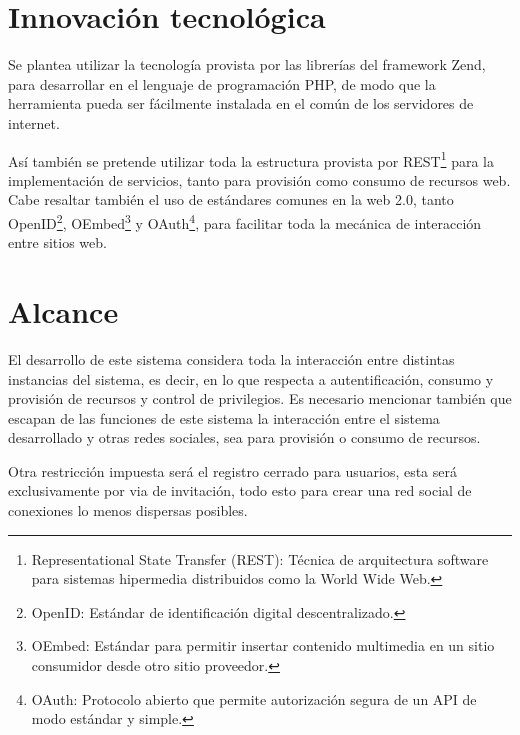 \documentclass[letterpaper,11pt]{article}
\begin{document}
\section{Innovación tecnológica}
Se plantea utilizar la tecnología provista por las librerías del framework Zend, para
desarrollar en el lenguaje de programación PHP, de modo que la herramienta pueda ser
fácilmente instalada en el común de los servidores de internet.

Así también se pretende utilizar toda la estructura provista por REST\footnote{Representational
State Transfer (REST): Técnica de arquitectura software para sistemas hipermedia distribuidos
como la World Wide Web.} para la implementación de servicios, tanto para provisión como
consumo de recursos web. Cabe resaltar también el uso de estándares comunes en la web 2.0, 
tanto OpenID\footnote{OpenID: Estándar de identificación digital descentralizado.},
OEmbed\footnote{OEmbed: Estándar para permitir insertar contenido multimedia en un sitio
consumidor desde otro sitio proveedor.} y OAuth\footnote{OAuth: Protocolo abierto que permite
autorización segura de un API de modo estándar y simple.}, para facilitar toda la mecánica de
interacción entre sitios web.

\section{Alcance}
El desarrollo de este sistema considera toda la interacción entre distintas instancias del
sistema, es decir, en lo que respecta a autentificación, consumo y provisión de recursos y
control de privilegios. Es necesario mencionar también que escapan de las funciones de
este sistema la interacción entre el sistema desarrollado y otras redes sociales, sea para
provisión o consumo de recursos.

Otra restricción impuesta será el registro cerrado para usuarios, esta será exclusivamente 
por via de invitación, todo esto para crear una red social de conexiones lo menos dispersas
posibles.
\end{document}
